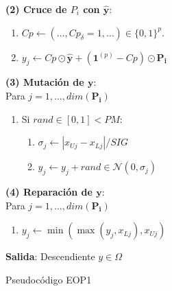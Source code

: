 \begin{minipage}{\textwidth}
\begin{algorithm}[H]
\begin{multicols}{2}
     \vspace{0.2cm} \textbf{(2) Cruce de $P_i$ con $\boldsymbol{\hat{y}}$}: 
            \begin{enumerate}
                \item $Cp \gets (\dots,  Cp_\delta=1, \dots) \in \{0,1\}^{p}$.
                \item $y_j \gets Cp \odot \boldsymbol{\hat{y}} +  (\boldsymbol{1}^{(p)} - Cp) \odot \boldsymbol{P_i}
                 $
            \end{enumerate}
            
    \end{multicols}
        
    \begin{multicols}{2}
    \vspace{0.2cm} \textbf{(3) Mutación de $\boldsymbol{y}$}:\\
    Para $j = 1, \dots, dim(\boldsymbol{P_i})$\\
            \begin{enumerate}
                \item Si $rand \in [0,1] < PM $: 
                \begin{enumerate}
                    \item $\sigma_j \gets |x_{Uj} - x_{Lj}|/SIG$
                    \item $y_j \gets y_j + rand \in \mathcal{N}(0, \sigma_j)$ 
                \end{enumerate}
            \end{enumerate}\columnbreak
            
        \vspace{0.2cm} \textbf{(4) Reparación de $\boldsymbol{y}$}: \\
        Para $j = 1, \dots, dim(\boldsymbol{P_i})$\\
            \begin{enumerate}
                \item $y_j \gets \min ( \max ( y_j , x_{Lj}), x_{Uj})$
            \end{enumerate}
    \end{multicols}
       
         \vspace{0.2cm}\textbf{Salida}: Descendiente $y \in \Omega$
     \caption{Pseudocódigo EOP1}
     \label{alg:2}
    \end{algorithm}
     \end{minipage}\\ \vspace{0.2cm}
    
